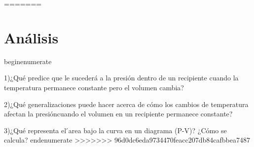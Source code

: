 \documentclass[]{article}
\begin{document}


=======
\section{Análisis}
begin{enumerate}
      \item 1)¿Qué predice que le sucederá a la presión dentro de un recipiente cuando la temperatura permanece constante pero el volumen cambia?
      \item 2)¿Qué generalizaciones puede hacer acerca de cómo los cambios de temperatura afectan la presióncuando el volumen en un recipiente permanece constante?
      \item 3)¿Qué representa el ́area bajo la curva en un diagrama (P-V)? ¿Cómo se calcula?
end{enumerate}
>>>>>>> 96d0dc6eda9734470feacc207db84cafbbea7487
\end{document}
